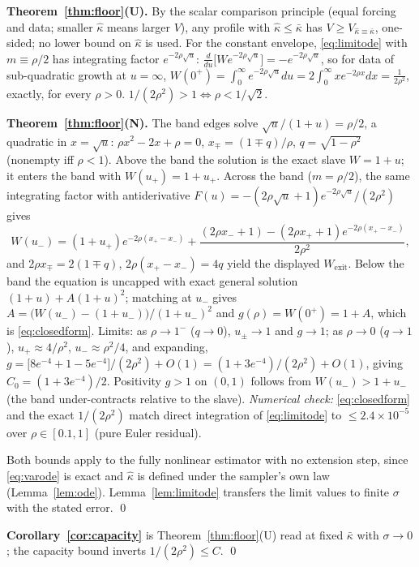\documentclass[11pt]{article}
\theoremstyle{remark}
\newcommand{\kb}{\bar\kappa}
\begin{document}
\textbf{Theorem~\ref{thm:floor}(U).} By the scalar comparison principle
(equal forcing and data; smaller $\hat\kappa$ means larger $V$), any profile with
$\hat\kappa\le\kb$ has $V\ge V_{\hat\kappa\equiv\kb}$, one-sided; no lower bound on
$\hat\kappa$ is used. For the constant envelope, \eqref{eq:limitode} with
$m\equiv\rho/2$ has integrating factor $e^{-2\rho\sqrt u}$:
$\frac{d}{du}\big[We^{-2\rho\sqrt u}\big]=-e^{-2\rho\sqrt u}$, so for data of
sub-quadratic growth at $u=\infty$,
$W(0^+)=\int_0^\infty e^{-2\rho\sqrt u}du=2\int_0^\infty xe^{-2\rho x}dx=\frac1{2\rho^2}$,
exactly, for every $\rho>0$. $1/(2\rho^2)>1\iff\rho<1/\sqrt2$.

\textbf{Theorem~\ref{thm:floor}(N).} The band edges solve $\sqrt u/(1+u)=\rho/2$, a
quadratic in $x=\sqrt u$: $\rho x^2-2x+\rho=0$, $x_\mp=(1\mp q)/\rho$, $q=\sqrt{1-\rho^2}$
(nonempty iff $\rho<1$). Above the band the solution is the exact slave $W=1+u$; it
enters the band with $W(u_+)=1+u_+$. Across the band ($m=\rho/2$), the same integrating
factor with antiderivative $F(u)=-(2\rho\sqrt u+1)e^{-2\rho\sqrt u}/(2\rho^2)$ gives
\[
W(u_-)=(1+u_+)e^{-2\rho(x_+-x_-)}
+\frac{(2\rho x_-+1)-(2\rho x_++1)e^{-2\rho(x_+-x_-)}}{2\rho^2},
\]
and $2\rho x_\mp=2(1\mp q)$, $2\rho(x_+-x_-)=4q$ yield the displayed $W_{\mathrm{exit}}$.
Below the band the equation is uncapped with exact general solution $(1+u)+A(1+u)^2$;
matching at $u_-$ gives $A=\big(W(u_-)-(1+u_-)\big)/(1+u_-)^2$ and
$g(\rho)=W(0^+)=1+A$, which is \eqref{eq:closedform}. Limits: as $\rho\to1^-$ ($q\to0$),
$u_\pm\to1$ and $g\to1$; as $\rho\to0$ ($q\to1$), $u_+\approx4/\rho^2$,
$u_-\approx\rho^2/4$, and expanding,
$g=\big[8e^{-4}+1-5e^{-4}\big]/(2\rho^2)+O(1)=(1+3e^{-4})/(2\rho^2)+O(1)$, giving
$C_0=(1+3e^{-4})/2$. Positivity $g>1$ on $(0,1)$ follows from $W(u_-)>1+u_-$ (the band
under-contracts relative to the slave). \emph{Numerical check:} \eqref{eq:closedform}
and the exact $1/(2\rho^2)$ match direct integration of \eqref{eq:limitode} to
$\le2.4\times10^{-5}$ over $\rho\in[0.1,1]$ (pure Euler residual).

Both bounds apply to the fully nonlinear estimator with no extension step, since
\eqref{eq:varode} is exact and $\hat\kappa$ is defined under the sampler's own law
(Lemma~\ref{lem:ode}). Lemma~\ref{lem:limitode} transfers the
limit values to finite $\sigma$ with the stated error. \qed

\textbf{Corollary~\ref{cor:capacity}} is Theorem~\ref{thm:floor}(U) read at fixed
$\kb$ with $\sigma\to0$; the capacity bound inverts $1/(2\rho^2)\le C$. \qed
\end{document}
